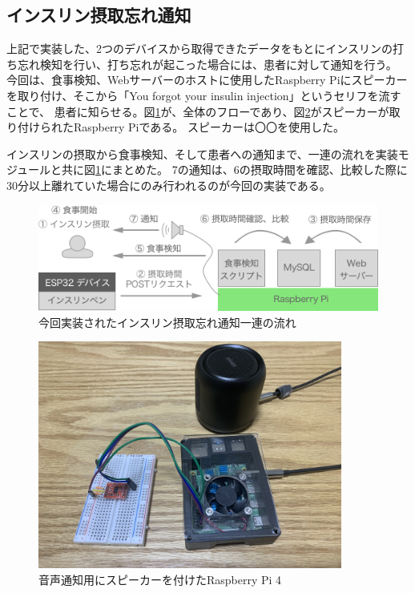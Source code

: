 \subsection{インスリン摂取忘れ通知}

上記で実装した、2つのデバイスから取得できたデータをもとにインスリンの打ち忘れ検知を行い、打ち忘れが起こった場合には、患者に対して通知を行う。
今回は、食事検知、Webサーバーのホストに使用したRaspberry Piにスピーカーを取り付け、そこから「You forgot your insulin injection」というセリフを流すことで、
患者に知らせる。図\ref{fig:system_flow}が、全体のフローであり、図\ref{fig:raspi_with_speaker}がスピーカーが取り付けられたRaspberry Piである。
スピーカーは〇〇を使用した。

インスリンの摂取から食事検知、そして患者への通知まで、一連の流れを実装モジュールと共に図\ref{fig:system_flow}にまとめた。
7の通知は、6の摂取時間を確認、比較した際に30分以上離れていた場合にのみ行われるのが今回の実装である。

\begin{figure}[htbp]
  \caption{今回実装されたインスリン摂取忘れ通知一連の流れ}
  \label{fig:system_flow}
  \begin{center}
    \includegraphics[bb=0 0 1000 400,width=15cm]{assets/system_flow_with_modules.png}
  \end{center}
\end{figure}

\begin{figure}[htbp]
  \caption{音声通知用にスピーカーを付けたRaspberry Pi 4}
  \label{fig:raspi_with_speaker}
  \begin{center}
    \includegraphics[bb=0 0 1400 1100,width=10cm]{assets/raspi_with_speaker.jpg}
  \end{center}
\end{figure}
